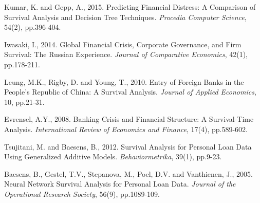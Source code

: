 \documentclass[doublespacing]{report} %
\begin{document}
\begin{thebibliography}{9}
Kumar, K. and Gepp, A., 2015. Predicting Financial Distress: A Comparison of Survival Analysis and Decision Tree Techniques. \textit{Procedia Computer Science}, 54(2), pp.396-404.

Iwasaki, I., 2014. Global Financial Crisis, Corporate Governance, and Firm Survival: The Russian Experience. \textit{Journal of Comparative Economics}, 42(1), pp.178-211.

Leung, M.K., Rigby, D. and Young, T., 2010. Entry of Foreign Banks in the People's Republic of China: A Survival Analysis. \textit{Journal of Applied Economics}, 10, pp.21-31.

Evrensel, A.Y., 2008. Banking Crisis and Financial Structure: A Survival-Time Analysis. \textit{International Review of Economics and Finance}, 17(4), pp.589-602.

Tsujitani, M. and Baesens, B., 2012. Survival Analysis for Personal Loan Data Using Generalized Additive Models. \textit{Behaviormetrika}, 39(1), pp.9-23.

Baesens, B., Gestel, T.V., Stepanova, M., Poel, D.V. and Vanthienen, J., 2005. Neural Network Survival Analysis for Personal Loan Data. \textit{Journal of the Operational Research Society}, 56(9), pp.1089-109.

\end{thebibliography}
\end{document}
